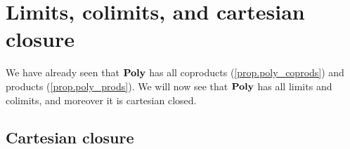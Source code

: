 \documentclass[Book-Poly]{subfiles}
\begin{document}
\section{Limits, colimits, and cartesian closure}

We have already seen that $\mathbf{Poly}$ has all coproducts (\cref{prop.poly_coprods}) and products (\cref{prop.poly_prods}).
We will now see that $\mathbf{Poly}$ has all limits and colimits, and moreover it is cartesian closed.

  


\subsection{Cartesian closure}
\end{document}
